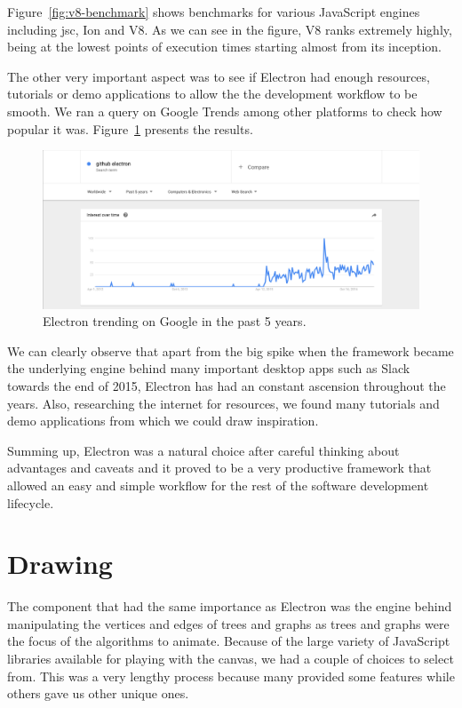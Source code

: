 \documentclass{l4proj}
\begin{document}
Figure~\ref{fig:v8-benchmark} shows benchmarks for various JavaScript engines including jsc, Ion and V8. As we can see in the
figure, V8 ranks extremely highly, being at the lowest points of execution times starting almost from its inception.

The other very important aspect was to see if Electron had enough resources, tutorials or demo applications to allow the
the development workflow to be smooth.
We ran a query on Google Trends among other platforms to check how popular it was.
Figure~\ref{fig:google-trends-electron} presents the results.

\begin{figure}[!ht]
    \centering
    \includegraphics[scale=0.35]{google-trends-electron}
    \caption{Electron trending on Google in the past 5 years.}
    \label{fig:google-trends-electron}
\end{figure}

We can clearly observe that apart from the big spike when the framework became the underlying engine behind many
important desktop apps such as Slack towards the end of 2015, Electron has had an constant ascension throughout the
years. Also, researching the internet for resources, we found many tutorials and demo applications from which we could draw inspiration.

Summing up, Electron was a natural choice after careful thinking about advantages and caveats and it proved to be a very productive framework that allowed an easy and simple workflow for the rest of the software development lifecycle.

\section{Drawing}

The component that had the same importance as Electron was the engine behind manipulating the vertices and edges of trees and graphs as trees and graphs were the focus of the algorithms to animate. Because of the large variety of JavaScript libraries available for playing with the canvas, we had a couple of choices to select from. This was a very lengthy process because many provided some features while others gave us other unique ones. 
\end{document}

